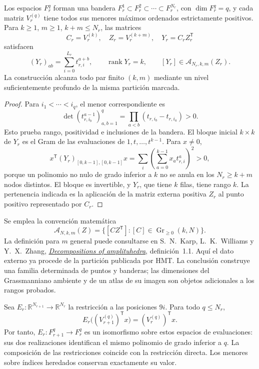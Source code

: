 \begin{theorem}
\label{thm:dim-all-ranks}
Los espacios \(F_r^q\) forman una bandera
\(F_r^1\subset F_r^2\subset\cdots\subset F_r^{N_r}\), con
\(\dim F_r^q=q\), y cada matriz \(V_r^{(q)}\) tiene todos sus
menores máximos ordenados estrictamente positivos. Para
\(k\geq1\), \(m\geq1\), \(k+m\leq N_r\), las matrices
\[
 C_r=V_r^{(k)},\quad Z_r=V_r^{(k+m)},\quad
 Y_r=C_rZ_r^{\mathsf T}
\]
satisfacen
\[
 (Y_r)_{ab}=\sum_{i=0}^{L_r}t_{r,i}^{a+b},\qquad
 \operatorname{rank}Y_r=k,\qquad
 [Y_r]\in\mathcal A_{N_r,k,m}(Z_r).
\]
La construcción alcanza todo par finito \((k,m)\) mediante un nivel
suficientemente profundo de la misma partición marcada.
\end{theorem}
\begin{proof}
Para \(i_1<\cdots<i_q\), el menor correspondiente es
\[
 \det(t_{r,i_b}^{a-1})_{a,b=1}^{q}
   =\prod_{a<b}(t_{r,i_b}-t_{r,i_a})>0.
\]
Esto prueba rango, positividad e inclusiones de la bandera. El bloque
inicial \(k\times k\) de \(Y_r\) es el Gram de las evaluaciones
de \(1,t,\ldots,t^{k-1}\). Para \(x\neq0\),
\[
 x^{\mathsf T}(Y_r)_{[0,k-1],[0,k-1]}x
 =\sum_i\left(\sum_{a=0}^{k-1}x_at_{r,i}^{a}\right)^2>0,
\]
porque un polinomio no nulo de grado inferior a \(k\) no se anula
en los \(N_r\geq k+m\) nodos distintos. El bloque es invertible,
y \(Y_r\), que tiene \(k\) filas, tiene rango \(k\).
La pertenencia indicada es la aplicación de la matriz externa positiva
\(Z_r\) al punto positivo representado por \(C_r\).
\end{proof}

Se emplea la convención matemática
\[
 \mathcal A_{N,k,m}(Z)=
 \{[CZ^{\mathsf T}]:[C]\in\operatorname{Gr}_{\geq0}(k,N)\}.
\]
La definición para \(m\) general puede consultarse en S.~N.~Karp,
L.~K.~Williams y Y.~X.~Zhang,
\href{https://people.math.harvard.edu/~williams/papers/amplituhedron-plus.pdf}
{\emph{Decompositions of amplituhedra}}, definición~1.1.
Aquí el dato externo ya procede de la partición publicada por HMT.
La conclusión construye una familia determinada de puntos y banderas;
las dimensiones del Grassmanniano ambiente y de un atlas de su imagen
son objetos adicionales a los rangos probados.

Sea \(E_r:\mathbb R^{N_{r+1}}\to\mathbb R^{N_r}\) la restricción
a las posiciones \(9i\). Para todo \(q\leq N_r\),
\[
 E_r\bigl((V_{r+1}^{(q)})^{\mathsf T}x\bigr)
       =(V_r^{(q)})^{\mathsf T}x.
\]
Por tanto, \(E_r:F_{r+1}^q\to F_r^q\) es un isomorfismo sobre
estos espacios de evaluaciones: sus dos realizaciones identifican el
mismo polinomio de grado inferior a \(q\). La composición de las
restricciones coincide con la restricción directa. Los menores sobre
índices heredados conservan exactamente su valor.

